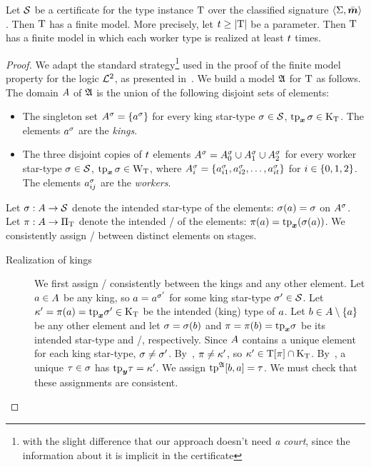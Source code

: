 \begin{theorem}\label{lem:cert-expand}
Let $\mathcal{S}$ be a certificate for the type instance $\mathrm{T}$ over the classified
signature $\left\langle \mathrm{\Sigma},\bar{\bm{m}} \right\rangle$.
Then $\mathrm{T}$ has a finite model.
More precisely, let $t \geq \left|\mathrm{T}\right|$ be a parameter.
Then $\mathrm{T}$ has a finite model in which each worker type is realized at least
$t$ times.
\end{theorem}
\begin{proof}
We adapt the standard strategy\footnote{with the slight difference that our
approach doesn't need \emph{a court}, since the information about it is implicit
in the certificate} used in the proof of the finite model property for the logic
$\mathcal{L}^{2}$, as presented in~\cite{gradel1999logics}.
We build a model $\mathfrak{A}$ for $\mathrm{T}$ as follows.
The domain $A$ of $\mathfrak{A}$ is the union of the following disjoint sets of
elements:
\begin{itemize}
  \item
  The singleton set $A^{\sigma} = \left\{a^{\sigma}\right\}$ for every king star-type
  $\sigma\in\mathcal{S}$, $\operatorname{tp}_{\bm{x}}\sigma \in {\mathrm{K}}_{\mathrm{T}}$.
  The elements $a^{\sigma}$ are the \emph{kings}.
  \item 
  The three disjoint copies of $t$ elements
  $A^{\sigma} = A^{\sigma}_{0} \cup A^{\sigma}_{1} \cup A^{\sigma}_{2}$ for every
  worker star-type $\sigma \in \mathcal{S}$, $\operatorname{tp}_{\bm{x}}\sigma \in {\mathrm{W}}_{\mathrm{T}}$,
  where $A^{\sigma}_{i} = \left\{a^{\sigma}_{i 1}, a^{\sigma}_{i 2}, \dots,
  a^{\sigma}_{i t}\right\}$ for $i \in \left\{0,1,2\right\}$.
  The elements $a^{\sigma}_{i j}$ are the \emph{workers}.
\end{itemize}
Let $\sigma : A \to \mathcal{S}$ denote the intended star-type of the elements:
$\sigma(a) = \sigma$ on $A^{\sigma}$.
Let $\pi : A \to {\Pi}_{\mathrm{T}}$ denote the intended \onetype/ of the elements:
$\pi(a) = \mathrm{tp}_{\bm{x}}(\sigma(a))$.
We consistently assign \twotypes/ between distinct elements on stages.
\begin{description}
  \item[Realization of kings]
  We first assign \twotypes/ consistently between the kings and any other
  element.
  Let $a\in A$ be any king,
  so $a = a^{{\sigma'}}$ for some king star-type ${\sigma'}\in\mathcal{S}$.
  Let ${\kappa'} = \pi(a) = \mathrm{tp}_{\bm{x}}{\sigma'} \in {\mathrm{K}}_{\mathrm{T}}$
  be the intended (king) type of $a$.
  Let $b \in A \setminus \left\{a\right\}$ be any other element and let
  $\sigma = \sigma(b)$ and $\pi = \pi(b) = \mathrm{tp}_{\bm{x}}\sigma$ be its intended
  star-type and \onetype/, respectively.
  Since $A$ contains a unique element for each king star-type,
  $\sigma\neq{\sigma'}$.
  By~, $\pi \neq {\kappa'}$,
  so ${\kappa'} \in \mathrm{T}[\pi] \cap {\mathrm{K}}_{\mathrm{T}}$.
  By~, a unique $\tau\in\sigma$ has $\mathrm{tp}_{\bm{y}}\tau = {\kappa'}$.
  We assign $\operatorname{tp}^{\mathfrak{A}}[b,a] = \tau$.
  We must check that these assignments are consistent.
  

\end{description}
\end{proof}
